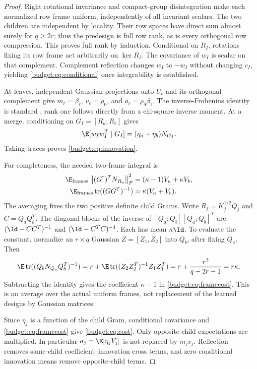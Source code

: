 \documentclass[11pt,oneside,openany,a4paper]{book}
\numberwithin{equation}{chapter}
\theoremstyle{definition}
\theoremstyle{remark}
\newcommand{\F}[1]{\left\lVert#1\right\rVert_F}
\DeclareMathOperator{\tr}{tr}\DeclareMathOperator{\rank}{rank}
\begin{document}
\begin{proof}
Right rotational invariance and compact-group disintegration make each normalized row frame uniform, independently of all invariant scalars. The two children are independent by locality. Their row spaces have direct sum almost surely for $q\ge2r$; thus the predesign is full row rank, as is every orthogonal row compression. This proves full rank by induction. Conditional on $R_I$, rotations fixing its row frame act arbitrarily on $\ker R_I$. The covariance of $w_I$ is scalar on that complement. Complement reflection changes $w_I$ to $-w_I$ without changing $c_I$, yielding \eqref{budget:eq:conditional} once integrability is established.

At leaves, independent Gaussian projections onto $U_\ell$ and its orthogonal complement give $m_\ell=\beta_\ell$, $v_\ell=\rho_0$, and $a_\ell=\rho_0\beta_\ell$. The inverse-Frobenius identity is standard \cite[Sec.~10.1]{HMT}; rank one follows directly from a chi-square inverse moment. At a merge, conditioning on $G_I=[R_a;R_b]$ gives
\[
 \E[w_Iw_I^T\mid G_I]=(\eta_a+\eta_b)N_{G_I}.
\]
Taking traces proves \eqref{budget:eq:innovation}.

For completeness, the needed two-frame integral is
\begin{align}
 \E_{\rm frames}\F{(G^\dagger)^TN_{R_a}}^2
  &=(\kappa-1)V_a+\kappa V_b,\label{budget:eq:framecost}\\
 \E_{\rm frames}\tr((GG^T)^{-1})&=\kappa(V_a+V_b).\label{budget:eq:frametrace}
\end{align}
The averaging fixes the two positive definite child Grams. Write $R_j=K_j^{1/2}Q_j$ and $C=Q_aQ_b^T$. The diagonal blocks of the inverse of $[Q_a;Q_b][Q_a;Q_b]^T$ are $(\Id-CC^T)^{-1}$ and $(\Id-C^TC)^{-1}$. Each has mean $\kappa\Id$. To evaluate the constant, normalize an $r\times q$ Gaussian $Z=[Z_1,Z_2]$ into $Q_b$, after fixing $Q_a$. Then
\[
 \E\tr((Q_bN_{Q_a}Q_b^T)^{-1})
 =r+\E\tr((Z_2Z_2^T)^{-1}Z_1Z_1^T)
 =r+\frac{r^2}{q-2r-1}=r\kappa.
\]
Subtracting the identity gives the coefficient $\kappa-1$ in \eqref{budget:eq:framecost}. This is an average over the actual uniform frames, not replacement of the learned designs by Gaussian matrices.

Since $\eta_j$ is a function of the child Gram, conditional covariance and \eqref{budget:eq:framecost} give \eqref{budget:eq:cost}. Only opposite-child expectations are multiplied. In particular $a_j=\E[\eta_jV_j]$ is not replaced by $m_jv_j$. Reflection removes same-child coefficient--innovation cross terms, and zero conditional innovation means remove opposite-child terms.


\end{proof}
\end{document}
